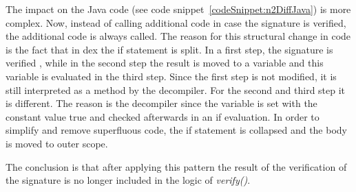 The impact on the Java code (see code snippet~\ref{codeSnippet:n2DiffJava}) is more complex.
Now, instead of calling additional code in case the signature is verified, the additional code is always called.
The reason for this structural change in code is the fact that in dex the if statement is split.
In a first step, the signature is verified , while in the second step the result is moved to a variable and this variable is evaluated in the third step.
Since the first step is not modified, it is still interpreted as a method by the decompiler.
For the second and third step it is different.
The reason is the decompiler since the variable is set with the constant value true and checked afterwards in an if evaluation.
In order to simplify and remove superfluous code, the if statement is collapsed and the body is moved to outer scope.
\newline


The conclusion is that after applying this pattern the result of the verification of the signature is no longer included in the logic of \textit{verify()}.

